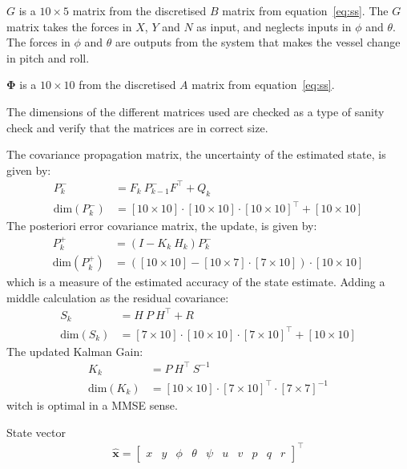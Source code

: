 $G$ is a $10 \times 5$ matrix from the discretised $B$ matrix from equation~\vref{eq:ss}. 
The $G$ matrix takes the forces in $X$, $Y$ and $N$ as input, and neglects inputs in $\phi$ and $\theta$. The forces in $\phi$ and $\theta$ are outputs from the system that makes the vessel change in pitch and roll.

$\boldsymbol \Phi$ is a $10 \times 10$ from the discretised $A$ matrix from equation~\vref{eq:ss}.

The dimensions of the different matrices used are checked as a type of sanity check and verify that the matrices are in correct size.

The covariance propagation matrix, the uncertainty of the estimated state, is given by:
\begin{align}
P_k^- &= F_k\ P_{k-1}^-F^\top + Q_k\\
\text{dim}(P_k^-) &= [10 \times 10]\cdot [10 \times 10]\cdot [10 \times 10]^\top + [10 \times 10]
\end{align}
The posteriori error covariance matrix, the update, is given by:
\begin{align}
P_k^+ &= (I - K_k\ H_k)P_k^-\\
\text{dim}(P_k^+) &= ([10 \times 10] - [10 \times 7]\cdot [7 \times 10])\cdot [10 \times 10]
\end{align}
which is a measure of the estimated accuracy of the state estimate. Adding a middle calculation as the residual covariance:
\begin{align}
S_k &= H\ P\ H^\top + R\\
\text{dim}(S_k) &= [7 \times 10]\cdot [10 \times 10]\cdot [7 \times 10]^\top + [10 \times 10]
\end{align}
The updated Kalman Gain:
\begin{align}
K_k &= P\ H^\top\ S^{-1}\\
\text{dim}(K_k) &= [10 \times 10]\cdot [7 \times 10]^\top\cdot [7 \times 7]^{-1}
\end{align}
witch is optimal in a \ac{MMSE} sense.

State vector
\begin{align}
\hat{\mathbf x}=
\begin{bmatrix}
x & y & \phi & \theta &\psi & u & v & p & q & r
\end{bmatrix}^\top
\end{align}


